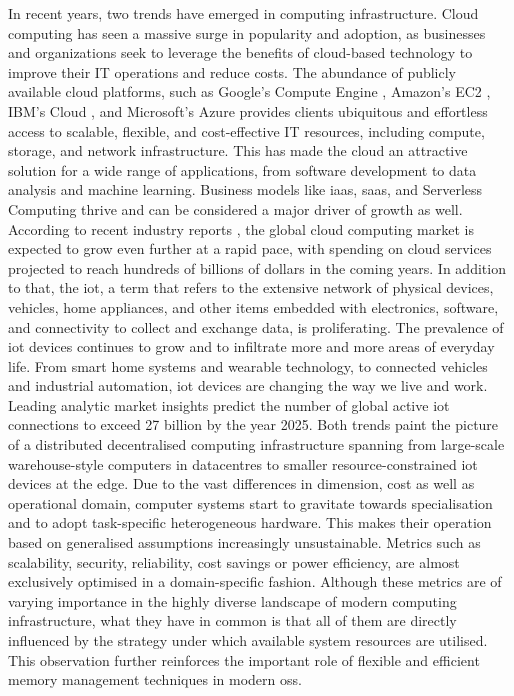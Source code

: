 In recent years, two trends have emerged in computing infrastructure.
Cloud computing has seen a massive surge in popularity and adoption, as businesses and organizations seek to leverage the benefits of cloud-based technology to improve their IT operations and reduce costs.
The abundance of publicly available cloud platforms, such as Google’s Compute Engine \cite{google-compute-engine}, Amazon’s EC2 \cite{aws-ec2}, IBM’s Cloud \cite{ibm-cloud}, and Microsoft’s Azure \cite{microsoft-azure} provides clients ubiquitous and effortless access to scalable, flexible, and cost-effective IT resources, including compute, storage, and network infrastructure.
This has made the cloud an attractive solution for a wide range of applications, from software development to data analysis and machine learning.
Business models like \ac{iaas}, \ac{saas}, and Serverless Computing thrive and can be considered a major driver of growth as well.
According to recent industry reports \cite{gartner2022}, the global cloud computing market is expected to grow even further at a rapid pace, with spending on cloud services projected to reach hundreds of billions of dollars in the coming years.
In addition to that, the \ac{iot}, a term that refers to the extensive network of physical devices, vehicles, home appliances, and other items embedded with electronics, software, and connectivity to collect and exchange data, is proliferating.
The prevalence of \ac{iot} devices continues to grow and to infiltrate more and more areas of everyday life.
From smart home systems and wearable technology, to connected vehicles and industrial automation, \ac{iot} devices are changing the way we live and work.
Leading analytic market insights \cite{iotanalytics2022} predict the number of global active \ac{iot} connections to exceed 27 billion by the year 2025.
Both trends paint the picture of a distributed decentralised computing infrastructure spanning from large-scale warehouse-style computers in datacentres to smaller resource-constrained \ac{iot} devices at the edge.
Due to the vast differences in dimension, cost as well as operational domain, computer systems start to gravitate towards specialisation and to adopt task-specific heterogeneous hardware.
This makes their operation based on generalised assumptions increasingly unsustainable.
Metrics such as scalability, security, reliability, cost savings or power efficiency, are almost exclusively optimised in a domain-specific fashion.
Although these metrics are of varying importance in the highly diverse landscape of modern computing infrastructure, what they have in common is that all of them are directly influenced by the strategy under which available system resources are utilised.
This observation further reinforces the important role of flexible and efficient memory management techniques in modern \acp{os}.

